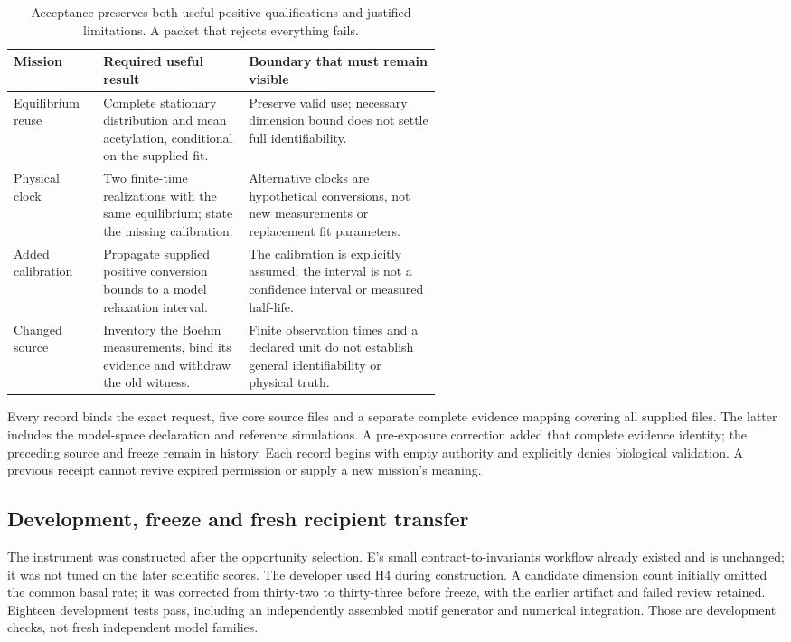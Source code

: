 \begin{table}[H]\small
\begin{tabularx}{\linewidth}{@{}p{0.21\linewidth}p{0.34\linewidth}X@{}}\toprule
Mission & Required useful result & Boundary that must remain visible \\ \midrule
Equilibrium reuse & Complete stationary distribution and mean acetylation, conditional on the supplied fit. & Preserve valid use; necessary dimension bound does not settle full identifiability. \\
Physical clock & Two finite-time realizations with the same equilibrium; state the missing calibration. & Alternative clocks are hypothetical conversions, not new measurements or replacement fit parameters. \\
Added calibration & Propagate supplied positive conversion bounds to a model relaxation interval. & The calibration is explicitly assumed; the interval is not a confidence interval or measured half-life. \\
Changed source & Inventory the Boehm measurements, bind its evidence and withdraw the old witness. & Finite observation times and a declared unit do not establish general identifiability or physical truth. \\ \bottomrule
\end{tabularx}
\caption{Acceptance preserves both useful positive qualifications and justified limitations. A packet that rejects everything fails.}
\end{table}

Every record binds the exact request, five core source files and a separate complete evidence mapping covering all supplied files. The latter includes the model-space declaration and reference simulations. A pre-exposure correction added that complete evidence identity; the preceding source and freeze remain in history. Each record begins with empty authority and explicitly denies biological validation. A previous receipt cannot revive expired permission or supply a new mission's meaning.

\subsection{Development, freeze and fresh recipient transfer}
The instrument was constructed after the opportunity selection. E's small contract-to-invariants workflow already existed and is unchanged; it was not tuned on the later scientific scores. The developer used H4 during construction. A candidate dimension count initially omitted the common basal rate; it was corrected from thirty-two to thirty-three before freeze, with the earlier artifact and failed review retained. Eighteen development tests pass, including an independently assembled motif generator and numerical integration. Those are development checks, not fresh independent model families.

